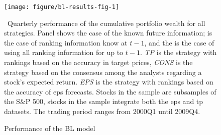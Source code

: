 \documentclass[a4paper,twoside,12pt,openright,notitlepage]{report}\usepackage[]{graphicx}\usepackage[]{color}
\makeatletter
\def\maxwidth{ %
  \ifdim\Gin@nat@width>\linewidth
    \linewidth
  \else
    \Gin@nat@width
  \fi
}
\newenvironment{knitrout}{}{} %
\makeatother
\begin{document}
\begin{figure}
\begin{knitrout}
\color{fgcolor}
\texttt{[image: figure/bl-results-fig-1]} 

\end{knitrout}
\caption{Performance of the BL model}
\label{fig:bl-results}
\ Quarterly performance of the cumulative portfolio wealth for all strategies. Panel \tr{} shows the case of the known future information; \naive{} is the case of ranking information know at $t-1$, and the  is the case of using all ranking information for up to $t-1$. \textit{TP} is the strategy with rankings based on the accuracy in target prices, \textit{CONS} is the strategy based on the consensus among the analysts regarding a stock's expected return. \textit{EPS} is the strategy with rankings based on the accuracy of \gls{eps} forecasts. Stocks in the \all{} sample are subsamples of the S\&P 500, stocks in the \same{} sample integrate both the \gls{eps} and \gls{tp} datasets. The trading period ranges from 2000Q1 until 2009Q4.
\end{figure}
\end{document}

